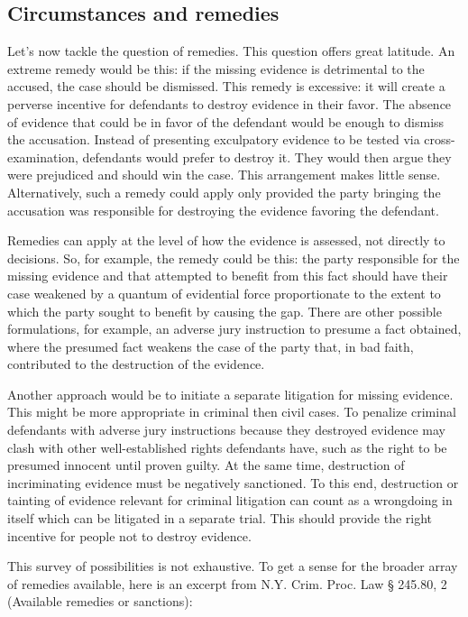 \documentclass[
  10pt,
  dvipsnames,enabledeprecatedfontcommands]{scrartcl}
\begin{document}
\hypertarget{circumstances-and-remedies}{%
\subsection{Circumstances and
remedies}\label{circumstances-and-remedies}}

Let's now tackle the question of remedies. This question offers great
latitude. An extreme remedy would be this: if the missing evidence is
detrimental to the accused, the case should be dismissed. This remedy is
excessive: it will create a perverse incentive for defendants to destroy
evidence in their favor. The absence of evidence that could be in favor
of the defendant would be enough to dismiss the accusation. Instead of
presenting exculpatory evidence to be tested via cross-examination,
defendants would prefer to destroy it. They would then argue they were
prejudiced and should win the case. This arrangement makes little sense.
Alternatively, such a remedy could apply only provided the party
bringing the accusation was responsible for destroying the evidence
favoring the defendant.

Remedies can apply at the level of how the evidence is assessed, not
directly to decisions. So, for example, the remedy could be this: the
party responsible for the missing evidence and that attempted to benefit
from this fact should have their case weakened by a quantum of
evidential force proportionate to the extent to which the party sought
to benefit by causing the gap. There are other possible formulations,
for example, an adverse jury instruction to presume a fact obtained,
where the presumed fact weakens the case of the party that, in bad
faith, contributed to the destruction of the evidence.

Another approach would be to initiate a separate litigation for missing
evidence. This might be more appropriate in criminal then civil cases.
To penalize criminal defendants with adverse jury instructions because
they destroyed evidence may clash with other well-established rights
defendants have, such as the right to be presumed innocent until proven
guilty. At the same time, destruction of incriminating evidence must be
negatively sanctioned. To this end, destruction or tainting of evidence
relevant for criminal litigation can count as a wrongdoing in itself
which can be litigated in a separate trial. This should provide the
right incentive for people not to destroy evidence.

This survey of possibilities is not exhaustive. To get a sense for the
broader array of remedies available, here is an excerpt from N.Y. Crim.
Proc. Law § 245.80, 2 (Available remedies or sanctions):
\end{document}
